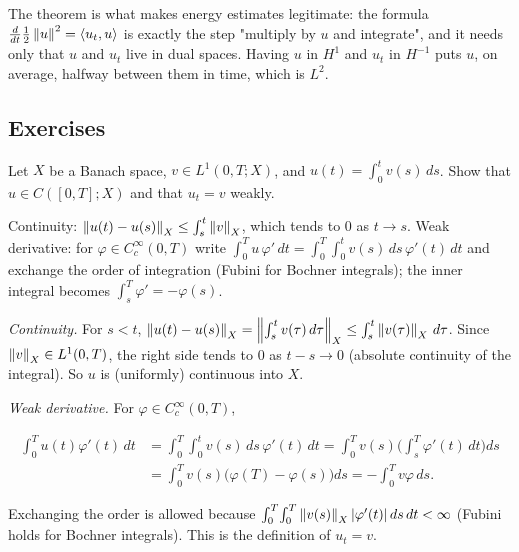 The theorem is what makes energy estimates legitimate: the formula $\frac{d}{dt}\frac12\left\lVert u\right\rVert^2 = \langle u_t, u\rangle$ is exactly the step "multiply by $u$ and integrate", and it needs only that $u$ and $u_t$ live in dual spaces. Having $u$ in $H^1$ and $u_t$ in $H^{-1}$ puts $u$, on average, halfway between them in time, which is $L^2$.

\subsection*{Exercises}

\begin{exercise}
  Let $X$ be a Banach space, $v \in L^1(0,T;X)$, and $u(t) = \int_0^t v(s)\,ds$. Show that $u \in C([0,T];X)$ and that $u_t = v$ weakly.
  \begin{hint}
    Continuity: $\left\lVert u(t) - u(s)\right\rVert_X \le \int_s^t \left\lVert v\right\rVert_X$, which tends to $0$ as $t \to s$. Weak derivative: for $\varphi \in C_c^\infty(0,T)$ write $\int_0^T u\,\varphi'\,dt = \int_0^T \int_0^t v(s)\,ds\,\varphi'(t)\,dt$ and exchange the order of integration (Fubini for Bochner integrals); the inner integral becomes $\int_s^T \varphi' = -\varphi(s)$.
  \end{hint}
  \begin{solution}
    \emph{Continuity.} For $s < t$, $\left\lVert u(t) - u(s)\right\rVert_X = \left\lVert \int_s^t v(\tau)\,d\tau\right\rVert_X \le \int_s^t \left\lVert v(\tau)\right\rVert_X\,d\tau$. Since $\left\lVert v\right\rVert_X \in L^1(0,T)$, the right side tends to $0$ as $t - s \to 0$ (absolute continuity of the integral). So $u$ is (uniformly) continuous into $X$.

    \emph{Weak derivative.} For $\varphi \in C_c^\infty(0,T)$,

    \[ \begin{aligned}
             \int_0^T u(t)\varphi'(t)\,dt &= \int_0^T\!\!\int_0^t v(s)\,ds\,\varphi'(t)\,dt = \int_0^T v(s)\Big(\int_s^T\varphi'(t)\,dt\Big)ds \\
             &= \int_0^T v(s)\big(\varphi(T) - \varphi(s)\big)ds = -\int_0^T v\varphi\,ds.
             \end{aligned} \]

    Exchanging the order is allowed because $\int_0^T\!\int_0^T \left\lVert v(s)\right\rVert_X|\varphi'(t)|\,ds\,dt < \infty$ (Fubini holds for Bochner integrals). This is the definition of $u_t = v$.
  \end{solution}
\end{exercise}

